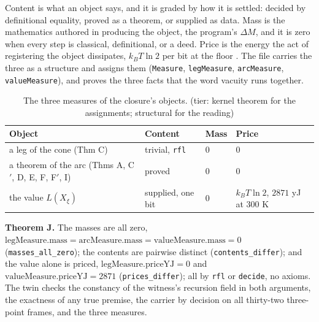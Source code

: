 \documentclass[10pt]{article}
\begin{document}
Content is what an object says, and it is graded by how it is settled:
decided by definitional equality, proved as a theorem, or supplied as
data. Mass is the mathematics authored in producing the object, the
program's \(\Delta M\), and it is zero when every step is classical,
definitional, or a deed. Price is the energy the act of registering the
object dissipates, \(k_B T \ln 2\) per bit at the floor
\cite{landauer1961, berut2012}. The file carries the three as a
structure and assigns them (\texttt{Measure}, \texttt{legMeasure},
\texttt{arcMeasure}, \texttt{valueMeasure}), and proves the three facts
that the word vacuity runs together.

\begin{table}[t]
\footnotesize
\caption{The three measures of the closure's objects. (tier: kernel theorem for the assignments; structural for the reading)}
\begin{tabular}{@{}p{}p{}p{}p{}@{}}
\toprule
Object & Content & Mass & Price \\
\midrule
a leg of the cone (Thm C) & trivial, \texttt{rfl} & $0$ & $0$ \\
a theorem of the arc (Thms A, C$'$, D, E, F, F$'$, I) & proved & $0$ & $0$ \\
the value $L(X_\xi)$ & supplied, one bit & $0$ & $k_B T \ln 2$, $2871$ yJ at $300$ K \\
\bottomrule
\end{tabular}
\end{table}

\textbf{Theorem J.} The masses are all zero,
\(\mathrm{legMeasure.mass} = \mathrm{arcMeasure.mass} = \mathrm{valueMeasure.mass} = 0\)
(\texttt{masses\_\allowbreak all\_\allowbreak zero}); the contents are
pairwise distinct (\texttt{contents\_\allowbreak differ}); and the value
alone is priced, \(\mathrm{legMeasure.priceYJ} = 0\) and
\(\mathrm{valueMeasure.priceYJ} = 2871\)
(\texttt{prices\_\allowbreak differ}); all by \texttt{rfl} or
\texttt{decide}, no axioms. The twin checks the constancy of the
witness's recursion field in both arguments, the exactness of any true
premise, the carrier by decision on all thirty-two three-point frames,
and the three measures.
\end{document}
